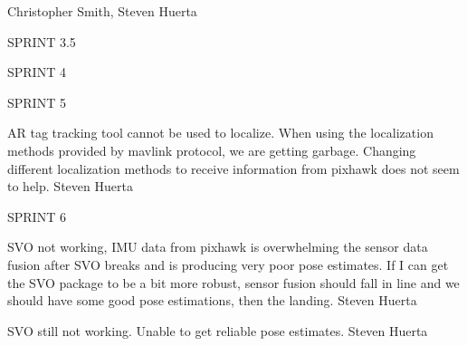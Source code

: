 \begin{description}
\hfill{Christopher Smith, Steven Huerta}

\item SPRINT 3.5

\item SPRINT 4

\item SPRINT 5

\item [2/22/16]  AR tag tracking tool cannot be used to localize. When using the localization methods provided by mavlink protocol, we are getting garbage. Changing different localization methods to receive information from pixhawk does not seem to help. \hfill{Steven Huerta}

\item SPRINT 6

\item [3/28/16]  SVO not working, IMU data from pixhawk is overwhelming the sensor data fusion after SVO breaks and is producing very poor pose estimates. If I can get the SVO package to be a bit more robust, sensor fusion should fall in line and we should have some good pose estimations, then the landing. \hfill{Steven Huerta}

\item [4/4/16]  SVO still not working. Unable to get reliable pose estimates.  \hfill{Steven Huerta}
\end{description}